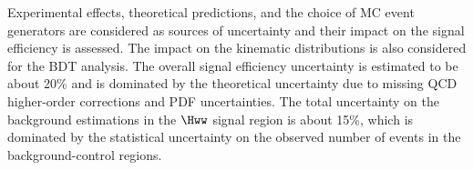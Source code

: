 Experimental effects, theoretical predictions, and the choice of MC
event generators are considered as sources of uncertainty and
their impact on the signal efficiency is assessed.  The impact on the
kinematic distributions is also considered for the BDT analysis. 
The overall signal efficiency uncertainty is estimated to be about 20\%
and is dominated by the theoretical uncertainty due to missing QCD
higher-order corrections and PDF uncertainties. The total uncertainty on the background estimations
in the $\Hww$ signal region is about 15\%, which is dominated by the
statistical uncertainty on the observed number of events in the background-control regions.

